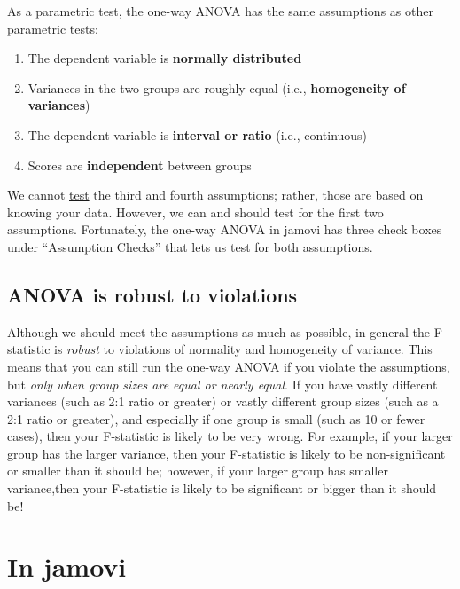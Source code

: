\documentclass[
]{book}
\begin{document}
As a parametric test, the one-way ANOVA has the same assumptions as other parametric tests:

\begin{enumerate}
\def\labelenumi{\arabic{enumi}.}
\item
  The dependent variable is \textbf{normally distributed}
\item
  Variances in the two groups are roughly equal (i.e., \textbf{homogeneity of variances})
\item
  The dependent variable is \textbf{interval or ratio} (i.e., continuous)
\item
  Scores are \textbf{independent} between groups
\end{enumerate}

We cannot \underline{test} the third and fourth assumptions; rather, those are based on knowing your data. However, we can and should test for the first two assumptions. Fortunately, the one-way ANOVA in jamovi has three check boxes under ``Assumption Checks'' that lets us test for both assumptions.

\hypertarget{anova-is-robust-to-violations}{%
\subsection{ANOVA is robust to violations}\label{anova-is-robust-to-violations}}

Although we should meet the assumptions as much as possible, in general the F-statistic is \emph{robust} to violations of normality and homogeneity of variance. This means that you can still run the one-way ANOVA if you violate the assumptions, but \emph{only when group sizes are equal or nearly equal}. If you have vastly different variances (such as 2:1 ratio or greater) or vastly different group sizes (such as a 2:1 ratio or greater), and especially if one group is small (such as 10 or fewer cases), then your F-statistic is likely to be very wrong. For example, if your larger group has the larger variance, then your F-statistic is likely to be non-significant or smaller than it should be; however, if your larger group has smaller variance,then your F-statistic is likely to be significant or bigger than it should be!

\hypertarget{in-jamovi}{%
\section{In jamovi}\label{in-jamovi}}
\end{document}
